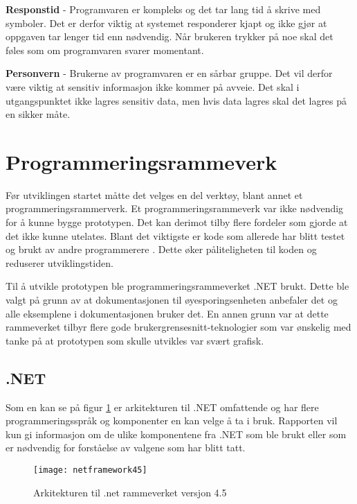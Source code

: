  \textbf{Responstid} -  Programvaren er kompleks og det tar lang tid å skrive med symboler. Det er derfor viktig at systemet responderer kjapt og ikke gjør at oppgaven tar lenger tid enn nødvendig. Når brukeren trykker på noe skal det føles som om programvaren svarer momentant. 

\textbf{Personvern} - Brukerne av programvaren er en sårbar gruppe. Det vil derfor være viktig at sensitiv informasjon ikke kommer på avveie. Det skal i utgangspunktet ikke lagres sensitiv data, men hvis data lagres skal det lagres på en sikker måte. 
 

\section{Programmeringsrammeverk} 

Før utviklingen startet måtte det velges en del verktøy, blant annet et programmeringsrammerverk. Et programmeringsrammeverk var ikke nødvendig for å kunne bygge prototypen. Det kan derimot tilby flere fordeler som gjorde at det ikke kunne utelates. Blant det viktigste er kode som allerede har blitt testet og brukt av andre programmerere \cite{Frame7:online}. Dette øker påliteligheten til koden og reduserer utviklingstiden.


Til å utvikle prototypen ble programmeringsrammeverket .NET brukt. Dette ble valgt på grunn av at dokumentasjonen til øyesporingsenheten anbefaler det og alle eksemplene i dokumentasjonen bruker det. En annen grunn var at dette rammeverket tilbyr flere gode brukergrensesnitt-teknologier som var ønskelig med tanke på at prototypen som skulle utvikles var svært grafisk.

\subsection{.NET}
 
Som en kan se på figur \ref{fig:net-arkitektur}  er arkitekturen til .NET omfattende og har flere programmeringsspråk og komponenter en kan velge å ta i bruk. Rapporten vil kun gi informasjon om de ulike komponentene fra .NET som ble brukt eller som er nødvendig for forståelse av valgene som har blitt tatt. 
 
 
\begin{figure}[ht] 
\centering 
\texttt{[image: netframework45]} 
\caption{Arkitekturen til .net rammeverket versjon 4.5} 
\label{fig:net-arkitektur} 
\end{figure} 
 
